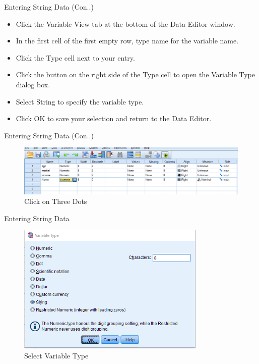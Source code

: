 \begin{frame}[t]{Entering String Data (Con..)}
	\begin{itemize}
		\item Click the Variable View tab at the bottom of the Data Editor window.
		\item In the first cell of the first empty row, type name for the variable name.
		\item Click the Type cell next to your entry.
		
		\item Click the button on the right side of the Type cell to open the Variable Type dialog box.
		\item Select String to specify the variable type.
		\item Click OK to save your selection and return to the Data Editor.
	\end{itemize}
\end{frame}
\begin{frame}[t]{Entering String Data (Con..)}
	\begin{figure}
		\centering
		\includegraphics[width=14cm]{img/string_data_1}
		\caption{Click on Three Dots}
	\end{figure}
\end{frame}
\begin{frame}[t]{Entering String Data}
	\begin{figure}
		\centering
		\includegraphics[width=9cm]{img/string_data_2}
		\caption{Select Variable Type}
	\end{figure}
\end{frame}




